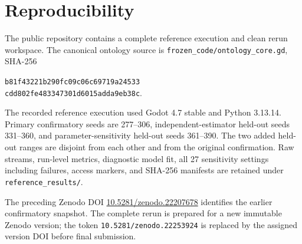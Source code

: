 \documentclass[10pt,journal,onecolumn]{IEEEtran}
\begin{document}
\enlargethispage{4\baselineskip}
\section{Reproducibility}
The public repository contains a complete reference execution and clean rerun workspace. The canonical ontology source is \texttt{frozen\_code/ontology\_core.gd}, SHA-256
\begin{center}
\small\texttt{b81f43221b290fc09c06c69719a24533}\\
\texttt{cdd802fe483347301d6015adda9eb38c}.
\end{center}
The recorded reference execution used Godot 4.7 stable and Python 3.13.14. Primary confirmatory seeds are 277--306, independent-estimator held-out seeds 331--360, and parameter-sensitivity held-out seeds 361--390. The two added held-out ranges are disjoint from each other and from the original confirmation. Raw streams, run-level metrics, diagnostic model fit, all 27 sensitivity settings including failures, access markers, and SHA-256 manifests are retained under \texttt{reference\_results/}.

The preceding Zenodo DOI \href{https://doi.org/10.5281/zenodo.22207678}{10.5281/zenodo.22207678} identifies the earlier confirmatory snapshot. The complete rerun is prepared for a new immutable Zenodo version; the token \texttt{10.5281/zenodo.22253924} is replaced by the assigned version DOI before final submission.
\end{document}
